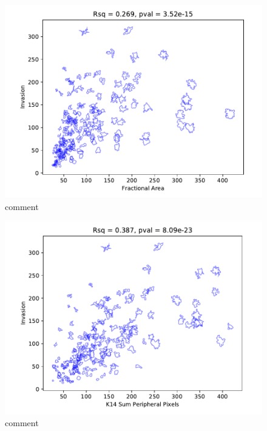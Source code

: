 \documentclass[10pt,letterpaper]{article}
\begin{document}
\begin{figure}[!h]
\centering
\includegraphics[width=\textwidth]{docs/01_paper/mouse_1_Day5_FA.pdf}
\caption{comment} 
\label{fig2}
\end{figure}

\begin{figure}[!h]
\includegraphics[width=\textwidth]{docs/01_paper/mouse_1_Day5_KPS.pdf}
\caption{comment} 
\label{fig3}
\end{figure}
\end{document}
